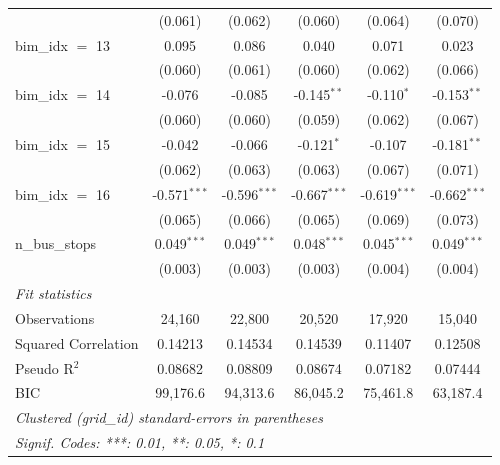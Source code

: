 \begin{tabular}{lccccc}
                       & (0.061)        & (0.062)        & (0.060)        & (0.064)        & (0.070)\\   
   bim\_idx $=$ 13     & 0.095          & 0.086          & 0.040          & 0.071          & 0.023\\   
                       & (0.060)        & (0.061)        & (0.060)        & (0.062)        & (0.066)\\   
   bim\_idx $=$ 14     & -0.076         & -0.085         & -0.145$^{**}$  & -0.110$^{*}$   & -0.153$^{**}$\\   
                       & (0.060)        & (0.060)        & (0.059)        & (0.062)        & (0.067)\\   
   bim\_idx $=$ 15     & -0.042         & -0.066         & -0.121$^{*}$   & -0.107         & -0.181$^{**}$\\   
                       & (0.062)        & (0.063)        & (0.063)        & (0.067)        & (0.071)\\   
   bim\_idx $=$ 16     & -0.571$^{***}$ & -0.596$^{***}$ & -0.667$^{***}$ & -0.619$^{***}$ & -0.662$^{***}$\\   
                       & (0.065)        & (0.066)        & (0.065)        & (0.069)        & (0.073)\\   
   n\_bus\_stops       & 0.049$^{***}$  & 0.049$^{***}$  & 0.048$^{***}$  & 0.045$^{***}$  & 0.049$^{***}$\\   
                       & (0.003)        & (0.003)        & (0.003)        & (0.004)        & (0.004)\\   
   \midrule
   \emph{Fit statistics}\\
   Observations        & 24,160         & 22,800         & 20,520         & 17,920         & 15,040\\  
   Squared Correlation & 0.14213        & 0.14534        & 0.14539        & 0.11407        & 0.12508\\  
   Pseudo R$^2$        & 0.08682        & 0.08809        & 0.08674        & 0.07182        & 0.07444\\  
   BIC                 & 99,176.6       & 94,313.6       & 86,045.2       & 75,461.8       & 63,187.4\\  
   \midrule \midrule
   \multicolumn{6}{l}{\emph{Clustered (grid\_id) standard-errors in parentheses}}\\
   \multicolumn{6}{l}{\emph{Signif. Codes: ***: 0.01, **: 0.05, *: 0.1}}\\
\end{tabular}
\par\endgroup


